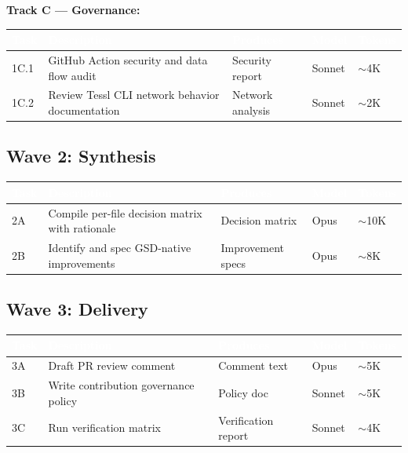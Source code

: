 \documentclass[11pt,letterpaper]{article}
\newcommand{\tableheader}[1]{\textbf{\sffamily\textcolor{white}{#1}}}
\begin{document}
\textbf{Track C --- Governance:}

\begin{center}
\begin{tabularx}{\textwidth}{C{1cm}XL{3cm}C{1.5cm}C{1.5cm}}
\toprule
{}
\tableheader{Task} & \tableheader{Description} & \tableheader{Produces} & \tableheader{Model} & \tableheader{Tokens} \\
\midrule
1C.1 & GitHub Action security and data flow audit & Security report & Sonnet & $\sim$4K \\
1C.2 & Review Tessl CLI network behavior documentation & Network analysis & Sonnet & $\sim$2K \\
\bottomrule
\end{tabularx}
\end{center}

\subsection{Wave 2: Synthesis}

\begin{center}
\begin{tabularx}{\textwidth}{C{1cm}XL{3cm}C{1.5cm}C{1.5cm}}
\toprule
{}
\tableheader{Task} & \tableheader{Description} & \tableheader{Produces} & \tableheader{Model} & \tableheader{Tokens} \\
\midrule
2A & Compile per-file decision matrix with rationale & Decision matrix & Opus & $\sim$10K \\
2B & Identify and spec GSD-native improvements & Improvement specs & Opus & $\sim$8K \\
\bottomrule
\end{tabularx}
\end{center}

\subsection{Wave 3: Delivery}

\begin{center}
\begin{tabularx}{\textwidth}{C{1cm}XL{3cm}C{1.5cm}C{1.5cm}}
\toprule
{}
\tableheader{Task} & \tableheader{Description} & \tableheader{Produces} & \tableheader{Model} & \tableheader{Tokens} \\
\midrule
3A & Draft PR review comment & Comment text & Opus & $\sim$5K \\
3B & Write contribution governance policy & Policy doc & Sonnet & $\sim$5K \\
3C & Run verification matrix & Verification report & Sonnet & $\sim$4K \\
\bottomrule
\end{tabularx}
\end{center}
\end{document}
